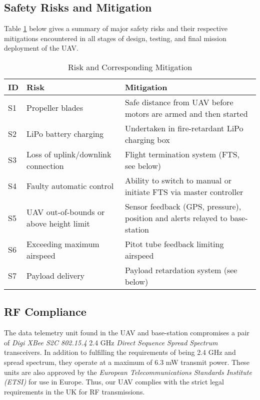 \subsection{Safety Risks and Mitigation}
Table \ref{tab:risks} below gives a summary of major safety risks and their respective mitigations encountered in all stages of design, testing, and final mission deployment of the UAV.

\begin{table}[h]
\begin{tabularx}{\textwidth}{ p{} | p{} | X } 
\textbf{ID} & \textbf{Risk} & \textbf{Mitigation} \\ \hline
S1 & Propeller blades & Safe distance from UAV before motors are armed and then started \\ \hline
S2 & LiPo battery charging & Undertaken in fire-retardant LiPo charging box \\ \hline
S3 & Loss of uplink/downlink connection & Flight termination system (FTS, see below) \\ \hline
S4 & Faulty automatic control & Ability to switch to manual or initiate FTS via master controller \\ \hline
S5 & UAV out-of-bounds or above height limit & Sensor feedback (GPS, pressure), position and alerts relayed to base-station \\ \hline
S6 & Exceeding maximum airspeed & Pitot tube feedback limiting airspeed \\ \hline
S7 & Payload delivery & Payload retardation system (see below) \\
\end{tabularx}
\caption{Risk and Corresponding Mitigation}
\label{tab:risks}
\end{table}

\subsection{RF Compliance} \label{sec:rf}
The data telemetry unit found in the UAV and base-station compromises a pair of \textit{Digi XBee S2C 802.15.4} 2.4 GHz \textit{Direct Sequence Spread Spectrum} transceivers. In addition to fulfilling the requirements of being 2.4 GHz and spread spectrum, they operate at a maximum of 6.3 mW transmit power. These units are also approved by the \textit{European Telecommunications Standards Institute (ETSI)} for use in Europe. Thus, our UAV complies with the strict legal requirements in the UK for RF transmissions.

